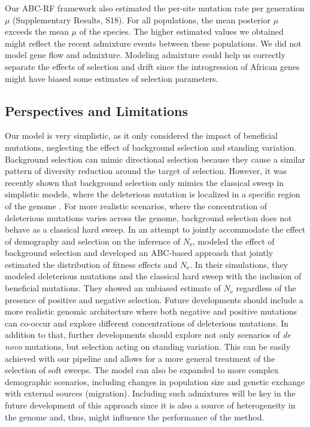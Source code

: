 \documentclass[a4paper, 12pt]{article}
\begin{document}
Our ABC-RF framework also estimated the per-site mutation rate per generation $\mu$ (Supplementary Results, S18). For all populations, the mean posterior $\mu$ exceeds the mean $\mu$ of the species. The higher estimated values we obtained might reflect the recent admixture events between these populations. We did not model gene flow and admixture. Modeling admixture could help us correctly separate the effects of selection and drift since the introgression of African genes might have biased some estimates of selection parameters.

\subsection*{Perspectives and Limitations}

Our model is very simplistic, as it only considered the impact of beneficial mutations, neglecting the effect of background selection and standing variation. Background selection can mimic directional selection because they cause a similar pattern of diversity reduction around the target of selection. However, it was recently shown that background selection only mimics the classical sweep in simplistic models, where the deleterious mutation is localized in a specific region of the genome \citep{Schrider:2020hka}. For more realistic scenarios, where the concentration of deleterious mutations varies across the genome, background selection does not behave as a classical hard sweep. In an attempt to jointly accommodate the effect of demography and selection on the inference of $N_{\mathrm{e}}$,  \citet{Johri:2020ee} modeled the effect of background selection and developed an ABC-based approach that jointly estimated the distribution of fitness effects and $N_{\mathrm{e}}$. In their simulations, they modeled deleterious mutations and the classical hard sweep with the inclusion of beneficial mutations. They showed an unbiased estimate of $N_{\mathrm{e}}$ regardless of the presence of positive and negative selection. Future developments should include a more realistic genomic architecture where both negative and positive mutations can co-occur and explore different concentrations of deleterious mutations. In addition to that, further developments should explore not only scenarios of \textit{de novo} mutations, but selection acting on standing variation. This can be easily achieved with our pipeline and allows for a more general treatment of the selection of soft sweeps. The model can also be expanded to more complex demographic scenarios, including changes in population size and genetic exchange with external sources (migration). Including such admixtures will be key in the future development of this approach since it is also a source of heterogeneity in the genome and, thus, might influence the performance of the method. 
\end{document}
